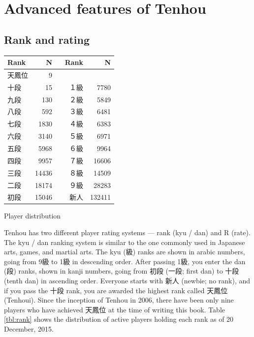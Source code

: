\chapter{Advanced features of {\jap Tenhou}} \label{ch:Tenhou2}
\thispagestyle{empty}

\section{Rank and rating}

\begin{floatingtable}[r]{
\footnotesize \captionsetup{font=footnotesize}
\centering
\begin{tabular}{l r r r}
\toprule
Rank & N & Rank & N\\
\midrule
天鳳位	&9\\
十段	&15&	１級	&7780\\
九段	&130&	２級	&5849\\
八段	&592&	３級	&6481\\
七段	&1830&	４級	&6383\\
六段	&3140&	５級	&6971\\
五段	&5968&	６級	&9964\\
四段	&9957&	７級	&16606\\
三段	&14436&	８級	&14509\\
二段	&18174&	９級	&28283\\
初段	&15046&	~~~新人&132411\\
\bottomrule
\end{tabular}}
\caption{Player distribution} \label{tbl:rank}
\end{floatingtable}

{\jap Tenhou} has two different player rating systems --- rank ({\jap kyu / dan}) and R (rate).
The {\jap kyu / dan} ranking system is similar to the one commonly used in Japanese arts, games, and martial arts.
The {\jap kyu} (級) ranks are shown in arabic numbers, going from 9級 to 1級 in descending order. After passing 1級, you enter the {\jap dan} (段) ranks, shown in {\jap kanji} numbers, going from 初段 (一段; first {\jap dan}) to 十段 (tenth {\jap dan}) in ascending order. Everyone starts with {\jap 新人} (newbie; no rank), and if you pass the 十段 rank, you are awarded the highest rank called 天鳳位 ({\jap Tenhoui}). Since the inception of {\jap Tenhou} in 2006, there have been only nine players who have achieved 天鳳位 at the time of writing this book.
Table \ref{tbl:rank} shows the distribution of active players holding each rank as of 20 December, 2015.

